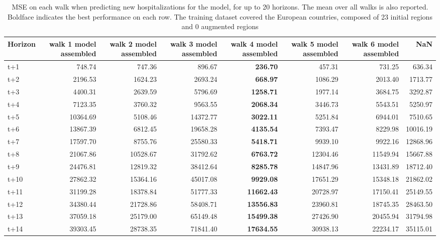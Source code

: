 \begin{table}[H]
\centering
\caption{MSE on each walk when predicting new hospitalizations for the model, for up to 20 horizons. The mean over all walks is also reported. Boldface indicates the best performance on each row. The training dataset covered the European countries, composed of 23 initial regions and 0 augmented regions }
\label{tab:MSE_walk_assembly}
\begin{tabular}{lrrrrrrr}
\toprule
Horizon &  walk 1 model assembled &  walk 2 model assembled &  walk 3 model assembled &  walk 4 model assembled &  walk 5 model assembled &  walk 6 model assembled &      NaN \\
\midrule
t+1  & 748.74  & 747.36  & 896.67  & \textbf{236.70}  & 457.31  & 731.25  & 636.34  \\
t+2  & 2196.53  & 1624.23  & 2693.24  & \textbf{668.97}  & 1086.29  & 2013.40  & 1713.77  \\
t+3  & 4400.31  & 2639.59  & 5796.69  & \textbf{1258.71}  & 1977.14  & 3684.75  & 3292.87  \\
t+4  & 7123.35  & 3760.32  & 9563.55  & \textbf{2068.34}  & 3446.73  & 5543.51  & 5250.97  \\
t+5  & 10364.69  & 5108.46  & 14372.77  & \textbf{3022.11}  & 5251.84  & 6944.01  & 7510.65  \\
t+6  & 13867.39  & 6812.45  & 19658.28  & \textbf{4135.54}  & 7393.47  & 8229.98  & 10016.19  \\
t+7  & 17597.70  & 8755.76  & 25580.33  & \textbf{5418.71}  & 9939.10  & 9922.16  & 12868.96  \\
t+8  & 21067.86  & 10528.67  & 31792.62  & \textbf{6763.72}  & 12304.46  & 11549.94  & 15667.88  \\
t+9  & 24476.81  & 12819.32  & 38412.64  & \textbf{8285.78}  & 14847.96  & 13431.89  & 18712.40  \\
t+10  & 27862.32  & 15364.16  & 45017.08  & \textbf{9929.08}  & 17651.29  & 15348.18  & 21862.02  \\
t+11  & 31199.28  & 18378.84  & 51777.33  & \textbf{11662.43}  & 20728.97  & 17150.41  & 25149.55  \\
t+12  & 34380.44  & 21728.86  & 58408.71  & \textbf{13556.83}  & 23960.81  & 18745.35  & 28463.50  \\
t+13  & 37059.18  & 25179.00  & 65149.48  & \textbf{15499.38}  & 27426.90  & 20455.94  & 31794.98  \\
t+14  & 39303.45  & 28738.35  & 71841.40  & \textbf{17634.55}  & 30938.13  & 22234.17  & 35115.01  \\

\end{tabular}
\end{table}
